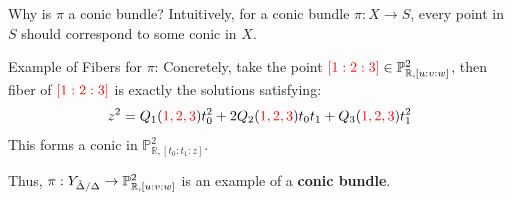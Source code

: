 \documentclass[hyperref, notheorems]{beamer}
\newcommand{\Rbb}{\mathbb{R}}
\newcommand{\Pbb}{\mathbb{P}}
\newcommand{\Ydd}{Y_{\Tilde{\Delta} /\Delta}}
\theoremstyle{definition}
\begin{document}
\begin{frame}{Why is $\pi$ a conic bundle?}
Intuitively, for a conic bundle $\pi: X \to S$, every point in $S$ should correspond to some conic in $X$. 
   \begin{block}{Example of Fibers for $\pi$:}
   Concretely, take the point ${\color{red}[1 : 2 : 3]} \in \Pbb^2_{\Rbb,[u:v:w]}$, then fiber of ${\color{red}[1 : 2 : 3]}$ is exactly the solutions satisfying:
   \[z^2 = Q_1({\color{red}1, 2, 3})t_0^2 + 2Q_2({\color{red}1, 2, 3})t_0t_1 + Q_3({\color{red}1, 2, 3})t_1^2\]
   This forms a conic in $\Pbb^2_{\Rbb, [t_0:t_1:z]}$.
   \end{block}
    Thus, $\pi: \Ydd \to \Pbb^2_{\Rbb, [u: v: w]}$ is an example of a \textbf{conic bundle}. 
\end{frame}


\end{document}
